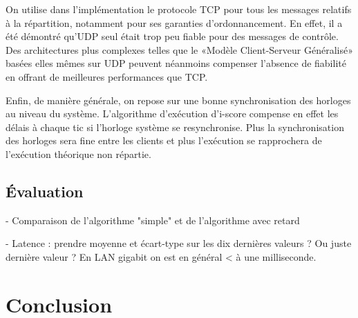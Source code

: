 \documentclass{article}
\begin{document}
On utilise dans l'implémentation le protocole TCP pour tous les messages relatifs à la répartition, notamment pour ses garanties d'ordonnancement.
En effet, il a été démontré qu'UDP seul était trop peu fiable pour des messages de contrôle. 
Des architectures plus complexes telles que le «Modèle Client-Serveur Généralisé» basées elles mêmes sur UDP peuvent néanmoins compenser l'absence de fiabilité\cite{mckinney2012oscthulhu} en offrant de meilleures performances que TCP.




Enfin, de manière générale, on repose sur une bonne synchronisation des horloges au niveau du système.
L'algorithme d'exécution d'i-score compense en effet les délais à chaque tic si l'horloge système se resynchronise.
Plus la synchronisation des horloges sera fine entre les clients et plus l'exécution se rapprochera de l'exécution théorique non répartie.


\subsection{Évaluation}
- Comparaison de l'algorithme "simple" et de l'algorithme avec retard


- Latence : prendre moyenne et écart-type sur les dix dernières valeurs ? Ou juste dernière valeur ?
En LAN gigabit on est en général < à une milliseconde.

\section{Conclusion}
\end{document}
